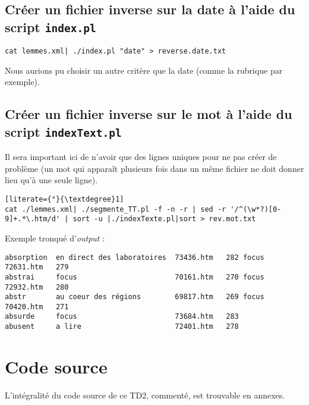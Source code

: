 \subsection{Créer un fichier inverse sur la date à l'aide du script \lstinline{index.pl}}

\fakeshell
\begin{lstlisting}
cat lemmes.xml| ./index.pl "date" > reverse.date.txt
\end{lstlisting}

Nous aurions pu choisir un autre critère que la date (comme la rubrique par exemple).

\subsection{Créer un fichier inverse sur le mot à l'aide du script \lstinline{indexText.pl}}

Il sera important ici de n'avoir que des lignes uniques pour ne pas créer de problème (un mot qui apparaît plusieurs fois dans un même fichier ne doit donner lieu qu'à une seule ligne).

\begin{lstlisting}[literate={°}{\textdegree}1]
cat ./lemmes.xml| ./segmente_TT.pl -f -n -r | sed -r '/^(\w*?)[0-9]+.*\.htm/d' | sort -u |./indexTexte.pl|sort > rev.mot.txt
\end{lstlisting}

\noindent Exemple tronqué d'\textit{output} :
\begin{lstlisting}
absorption  en direct des laboratoires  73436.htm   282 focus   72631.htm   279
abstrai     focus                       70161.htm   270 focus   72932.htm   280
abstr       au coeur des régions        69817.htm   269 focus   70420.htm   271
absurde     focus                       73684.htm   283
abusent     a lire                      72401.htm   278
\end{lstlisting}

\section{Code source}

L'intégralité du code source de ce TD2, commenté, est trouvable en annexes.
